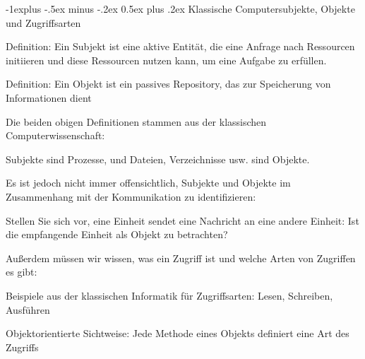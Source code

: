 \documentclass[a4paper]{article}
\makeatletter
\renewcommand{\subsection}{\@startsection{subsection}{2}{0mm}%
 {-1explus -.5ex minus -.2ex}%
 {0.5ex plus .2ex}%
 {\normalfont\normalsize\bfseries}}
\makeatother
\begin{document}
\begin{multicols}{3}
      \subsection{Klassische Computersubjekte, Objekte und Zugriffsarten}
      \begin{itemize*}
            \item Definition: Ein Subjekt ist eine aktive Entität, die eine Anfrage nach Ressourcen initiieren und diese Ressourcen nutzen kann, um eine Aufgabe zu erfüllen.
            \item Definition: Ein Objekt ist ein passives Repository, das zur Speicherung von Informationen dient
            \item Die beiden obigen Definitionen stammen aus der klassischen Computerwissenschaft:
            \begin{itemize*}
                  \item Subjekte sind Prozesse, und Dateien, Verzeichnisse usw. sind Objekte.
            \end{itemize*}
            \item Es ist jedoch nicht immer offensichtlich, Subjekte und Objekte im Zusammenhang mit der Kommunikation zu identifizieren:
            \begin{itemize*}
                  \item Stellen Sie sich vor, eine Einheit sendet eine Nachricht an eine andere Einheit: Ist die empfangende Einheit als Objekt zu betrachten?
            \end{itemize*}
            \item Außerdem müssen wir wissen, was ein Zugriff ist und welche Arten von Zugriffen es gibt:
            \begin{itemize*}
                  \item Beispiele aus der klassischen Informatik für Zugriffsarten: Lesen, Schreiben, Ausführen
                  \item Objektorientierte Sichtweise: Jede Methode eines Objekts definiert eine Art des Zugriffs
            \end{itemize*}
      \end{itemize*}


\end{multicols}
\end{document}
